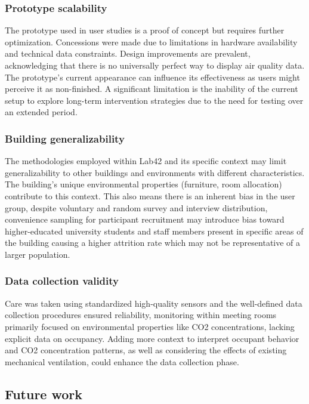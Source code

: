 \subsubsection{Prototype scalability}
The prototype used in user studies is a proof of concept but requires further optimization. Concessions were made due to limitations in hardware availability and technical data constraints. Design improvements are prevalent, acknowledging that there is no universally perfect way to display air quality data. The prototype's current appearance can influence its effectiveness as users might perceive it as non-finished. A significant limitation is the inability of the current setup to explore long-term intervention strategies due to the need for testing over an extended period. 

\subsubsection{Building generalizability}
The methodologies employed within Lab42 and its specific context may limit generalizability to other buildings and environments with different characteristics.  The building's unique environmental properties (furniture, room allocation) contribute to this context. This also means there is an inherent bias in the user group, despite voluntary and random survey and interview distribution, convenience sampling for participant recruitment may introduce bias toward higher-educated university students and staff members present in specific areas of the building causing a higher attrition rate which may not be representative of a larger population. 

\subsubsection{Data collection validity}
Care was taken using standardized high-quality sensors and the well-defined data collection procedures ensured reliability, monitoring within meeting rooms primarily focused on environmental properties like CO2 concentrations, lacking explicit data on occupancy. Adding more context to interpret occupant behavior and CO2 concentration patterns, as well as considering the effects of existing mechanical ventilation, could enhance the data collection phase.

\subsection{Future work}

